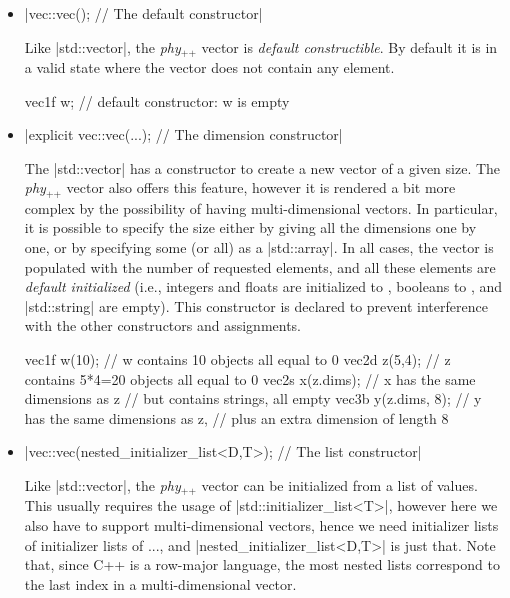 \documentclass[12pt]{report}
\newcommand{\phypp}{\textit{phy}$_{\text{++}}$\xspace}
\newcommand{\stdvec}{\cppinline|std::vector|\xspace}
\newenvironment{example}
{
    \begin{mdframed}[style=example,frametitle={Example}]
}
{
    \end{mdframed}
}
\begin{document}
\begin{itemize}
\item \cppinline|vec::vec(); // The default constructor|

Like \stdvec, the \phypp vector is \emph{default constructible}. By default it is in a valid state where the vector does not contain any element.

\begin{example}
\begin{cppcode}
vec1f w; // default constructor: w is empty
\end{cppcode}
\end{example}

\item \cppinline|explicit vec::vec(...); // The dimension constructor|

The \stdvec has a constructor to create a new vector of a given size. The \phypp vector also offers this feature, however it is rendered a bit more complex by the possibility of having multi-dimensional vectors. In particular, it is possible to specify the size either by giving all the dimensions one by one, or by specifying some (or all) as a \cppinline|std::array|. In all cases, the vector is populated with the number of requested elements, and all these elements are \emph{default initialized} (i.e., integers and floats are initialized to , booleans to , and \cppinline|std::string| are empty). This constructor is declared  to prevent interference with the other constructors and assignments.

\begin{example}
\begin{cppcode}
vec1f w(10);     // w contains 10 objects all equal to 0
vec2d z(5,4);    // z contains 5*4=20 objects all equal to 0
vec2s x(z.dims); // x has the same dimensions as z
                 // but contains strings, all empty
vec3b y(z.dims, 8); // y has the same dimensions as z,
                 // plus an extra dimension of length 8
\end{cppcode}
\end{example}

\item \cppinline|vec::vec(nested_initializer_list<D,T>); // The list constructor|

Like \stdvec, the \phypp vector can be initialized from a list of values. This usually requires the usage of \cppinline|std::initializer_list<T>|, however here we also have to support multi-dimensional vectors, hence we need initializer lists of initializer lists of ..., and \cppinline|nested_initializer_list<D,T>| is just that. Note that, since C++ is a row-major language, the most nested lists correspond to the last index in a multi-dimensional vector.


\end{itemize}
\end{document}
